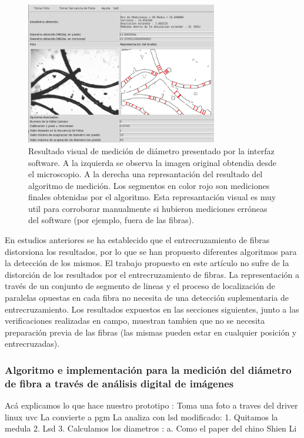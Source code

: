 \documentclass[runningheads,a4paper]{llncs}
\begin{document}
\begin{figure}
\centering
\includegraphics[height=6.2cm]{captura}
\caption{Resultado visual de medición de diámetro presentado por la interfaz software. A la izquierda se observa la imagen original obtendia desde el microscopio. A la derecha una represantación del resultado del algoritmo de medición. Los segmentos en color rojo son mediciones finales obtenidas por el algoritmo. Esta represantación visual es muy util para corroborar manualmente si hubieron mediciones erróneas del software (por ejemplo, fuera de las fibras).
}
\label{fig:captura}
\end{figure}



En estudios anteriores se ha establecido que el entrecruzamiento de fibras distorsiona los resultados, por lo que se han propuesto diferentes algoritmos para la detección de los mismos.
El trabajo propuesto en este artículo no sufre de la distorción de los resultados por el entrecruzamiento de fibras. 
La representación a través de un conjunto de segmento de lineas y el proceso de localización de paralelas opuestas en cada fibra no necesita de una detección suplementaria de entrecruzamiento. Los resultados expuestos en las secciones siguientes, junto a las verificaciones realizadas en campo, muestran tambien que no se necesita preparación previa de las fibras (las mismas pueden estar en cualquier posición y entrecruzadas).



	

\subsubsection{Algoritmo e implementación para la medición del diámetro de fibra a través de análisis digital de imágenes}

Acá explicamos lo que hace nuestro prototipo :
Toma una foto a traves del driver linux uvc
La convierte a pgm
La analiza con lsd modificado:
1. Quitamos la medula
2. Lsd
3. Calculamos los diametros :
a. Como el paper del chino Shien Li
\end{document}
